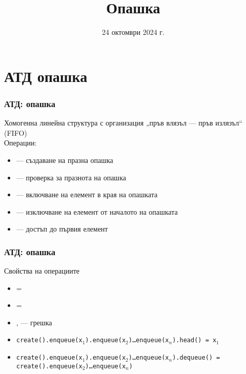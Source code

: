 \documentclass[alsotrans,beameroptions={aspectratio=169}]{beamerswitch}
\title{Опашка}
\date{24 октомври  2024 г.}
\begin{document}
\begin{frame}
  \titlepage
\end{frame}

\section{АТД опашка}

\begin{frame}
  \frametitle{АТД: опашка}

  Хомогенна линейна структура с организация „пръв влязъл --- пръв излязъл“ (FIFO)\\[2ex]
  Операции:\\[1ex]
  \begin{itemize}
  \item {} --- създаване на празна опашка
  \item {} --- проверка за празнота на опашка
  \item {} --- включване на елемент в края на опашката
  \item {} --- изключване на елемент от началото на опашката
  \item {} --- достъп до първия елемент
  \end{itemize}
\end{frame}

\begin{frame}
  \frametitle{АТД: опашка}

  Свойства на операциите\\[1ex]
  \small
  \begin{itemize}
  \item {} = 
  \item {} = 
  \item {},  --- \alert{грешка}
  \item \tt{create().enqueue(x$_1$).enqueue(x$_2$)\ldots{}enqueue(x$_n$).head() = x$_1$}
  \item \tt{create().enqueue(x$_1$).enqueue(x$_2$)\ldots{}enqueue(x$_n$).dequeue() = create().enqueue(x$_2$)\ldots{}enqueue(x$_n$)}
  \end{itemize}
\end{frame}
\end{document}
